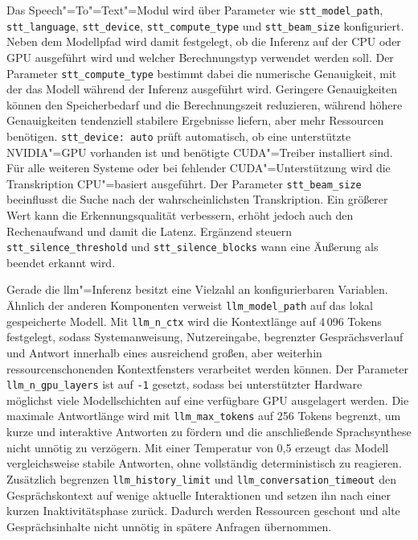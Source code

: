 Das Speech"=To"=Text"=Modul wird über Parameter wie \texttt{stt\_model\_path}, \texttt{stt\_language}, \texttt{stt\_device}, \texttt{stt\_compute\_type} und \texttt{stt\_beam\_size} konfiguriert. Neben dem Modellpfad wird damit festgelegt, ob die Inferenz auf der CPU oder GPU ausgeführt wird und welcher Berechnungstyp verwendet werden soll. Der Parameter \texttt{stt\_compute\_type} bestimmt dabei die numerische Genauigkeit, mit der das Modell während der Inferenz ausgeführt wird. Geringere Genauigkeiten können den Speicherbedarf und die Berechnungszeit reduzieren, während höhere Genauigkeiten tendenziell stabilere Ergebnisse liefern, aber mehr Ressourcen benötigen. \texttt{stt\_device: auto} prüft automatisch, ob eine unterstützte NVIDIA"=GPU vorhanden ist und benötigte CUDA"=Treiber installiert sind. Für alle weiteren Systeme oder bei fehlender CUDA"=Unterstützung wird die Transkription CPU"=basiert ausgeführt. Der Parameter \texttt{stt\_beam\_size} beeinflusst die Suche nach der wahrscheinlichsten Transkription. Ein größerer Wert kann die Erkennungsqualität verbessern, erhöht jedoch auch den Rechenaufwand und damit die Latenz. Ergänzend steuern \texttt{stt\_silence\_threshold} und \texttt{stt\_silence\_blocks} wann eine Äußerung als beendet erkannt wird.

Gerade die \gls{llm}"=Inferenz besitzt eine Vielzahl an konfigurierbaren Variablen. Ähnlich der anderen Komponenten verweist \texttt{llm\_model\_path} auf das lokal gespeicherte Modell. Mit \texttt{llm\_n\_ctx} wird die Kontextlänge auf 4\,096 Tokens festgelegt, sodass Systemanweisung, Nutzereingabe, begrenzter Gesprächsverlauf und Antwort innerhalb eines ausreichend großen, aber weiterhin ressourcenschonenden Kontextfensters verarbeitet werden können. Der Parameter \texttt{llm\_n\_gpu\_layers} ist auf \texttt{-1} gesetzt, sodass bei unterstützter Hardware möglichst viele Modellschichten auf eine verfügbare GPU ausgelagert werden. Die maximale Antwortlänge wird mit \texttt{llm\_max\_tokens} auf 256 Tokens begrenzt, um kurze und interaktive Antworten zu fördern und die anschließende Sprachsynthese nicht unnötig zu verzögern. Mit einer Temperatur von 0,5 erzeugt das Modell vergleichsweise stabile Antworten, ohne vollständig deterministisch zu reagieren. Zusätzlich begrenzen \texttt{llm\_history\_limit} und \texttt{llm\_conversation\_timeout} den Gesprächskontext auf wenige aktuelle Interaktionen und setzen ihn nach einer kurzen Inaktivitätsphase zurück. Dadurch werden Ressourcen geschont und alte Gesprächsinhalte nicht unnötig in spätere Anfragen übernommen.

